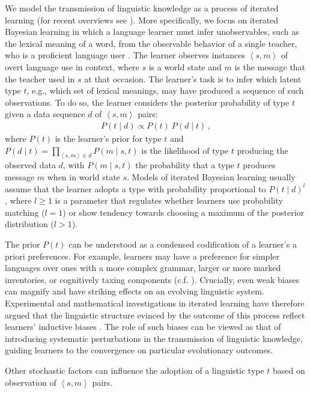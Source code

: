 \documentclass[10pt,a4paper]{article}
\newcommand{\tuple}[1]{\ensuremath{\left\langle #1 \right\rangle}}
\begin{document}
We model the transmission of linguistic knowledge as a process of iterated learning (for recent
overviews see \citealt{kirby+etal:2014, tamariz+kirby:2016}). More specifically, we focus on
iterated Bayesian learning in which a language learner must infer unobservables, such as the
lexical meaning of a word, from the observable behavior of a single teacher, who is a
proficient language user \citep[e.g.][]{griffiths+kalish:2007}. The learner observes instances
$\tuple{s,m}$ of overt language use in context, where $s$ is a world state and $m$ is the
message that the teacher used in $s$ at that occasion. The learner's task is to infer which
latent type $t$, e.g., which set of lexical meanings, may have produced a sequence of such
observations. To do so, the learner considers the posterior probability of type $t$ given a
data sequence $d$ of $\tuple{s, m}$ pairs:
\begin{align*}
  P(t \mid d) \propto P(t) \ P(d \mid t)\,,
\end{align*}
where $P(t)$ is the learner's prior for type $t$ and
$P(d \mid t) = \prod_{\tuple{s,m} \in d} P(m \mid s, t)$ is the likelihood of type $t$
producing the observed data $d$, with $P(m \mid s, t)$ the probability that a type $t$ produces
message $m$ when in world state $s$. Models of iterated Bayesian learning usually assume that
the learner adopts a type with probability proportional to $P(t \mid d)^l$, where $l \ge 1$ is
a parameter that regulates whether learners use probability matching ($l = 1$) or show tendency
towards choosing a maximum of the posterior distribution ($l > 1$).


The prior $P(t)$ can be understood as a condensed codification of a learner's a priori
preferences. For example, learners may have a preference for simpler languages over ones with a
more complex grammar, larger or more marked inventories, or cognitively taxing components
(c.f. \citealt{feldman:2000,chater+vitanyi:2003, kirby+etal:2015}). Crucially, even weak biases
can magnify and have striking effects on an evolving linguistic system. Experimental and
mathematical investigations in iterated learning have therefore argued that the linguistic
structure evinced by the outcome of this process reflect learners' inductive biases
\citep{kirby+etal:2007,kirby+etal:2014}. The role of such biases can be viewed as that of
introducing systematic perturbations in the transmission of linguistic knowledge, guiding
learners to the convergence on particular evolutionary outcomes. 

Other stochastic factors can influence the adoption of a linguistic type $t$ based on
observation of $\tuple{s,m}$ pairs.
\end{document}

